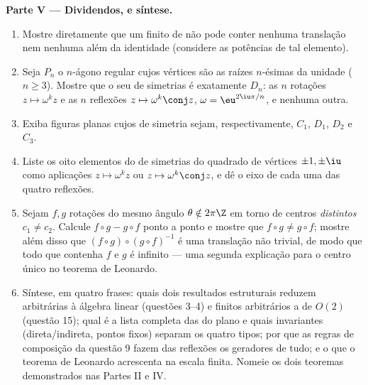 \begin{problem}
\medskip
\noindent\textbf{Parte V --- Dividendos, e síntese.}
\begin{enumerate}[resume]
  \item Mostre diretamente que um  finito de  não
        pode conter nenhuma translação nem nenhuma  além da identidade (considere as potências de
        tal elemento).
  \item Seja $P_n$ o $n$-ágono regular cujos vértices são as raízes
        $n$-ésimas da unidade ($n \geq 3$). Mostre que o seu  de
        simetrias é exatamente $D_n$: as $n$ rotações $z
        \mapsto \omega^k z$ e as $n$
        reflexões $z \mapsto
        \omega^k \conj z$, $\omega = \eu^{2\iu\pi/n}$, e nenhuma outra.
  \item Exiba figuras planas cujos  de simetria sejam,
        respectivamente, $C_1$, $D_1$, $D_2$ e $C_3$.
  \item Liste os oito elementos do  de simetrias do quadrado de
        vértices $\pm1, \pm\iu$ como aplicações $z \mapsto
        \omega^k z$ ou $z \mapsto \omega^k\conj z$, e dê o eixo
        de cada uma das quatro reflexões.
  \item Sejam $f, g$ rotações do mesmo ângulo $\theta
        \notin 2\pi\Z$ em torno de
        centros \emph{distintos} $c_1 \neq
        c_2$. Calcule $f\circ g - g\circ f$ ponto a ponto
        e mostre que $f\circ g \neq g\circ f$; mostre além disso que $(f \circ
        g)\circ(g\circ f)^{-1}$ é uma
        translação não trivial, de modo que todo  que contenha
        $f$ e $g$ é infinito --- uma segunda explicação para o
        centro único no teorema de Leonardo.
  \item Síntese, em quatro frases: quais dois resultados
        estruturais reduzem  arbitrárias à álgebra linear
        (questões 3--4) e  finitos arbitrários a  de
        $O(2)$ (questão 15); qual é a lista completa das 
        do plano e quais invariantes (direta/indireta, pontos fixos)
        separam os quatro tipos; por que as regras de composição da
        questão 9 fazem das reflexões os geradores de tudo; e o que
        o teorema de Leonardo acrescenta na escala finita. Nomeie os
        dois teoremas demonstrados nas Partes II e IV.
\end{enumerate}
\end{problem}
